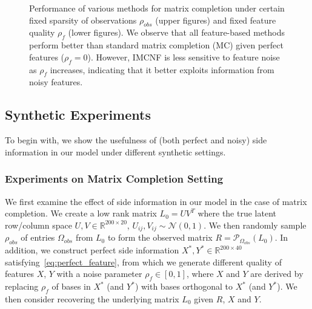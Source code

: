 \documentclass[twoside,11pt]{article}
\def\R{\mathbb{R}}
\def\Obs{\Omega_{obs}}
\newcommand\proj[1]{{\mathcal P}_{#1}}
\def\gau{{\mathcal N}}
\def\realL{L_0}
\begin{document}
\begin{figure}[tp]
  \caption{Performance of various methods for matrix completion under certain fixed sparsity of observations
    $\rho_{obs}$ (upper figures) and fixed feature quality $\rho_f$ (lower figures).
    We observe that all feature-based methods perform better than standard matrix completion (MC)
    given perfect features ($\rho_f = 0$).  However, IMCNF
    is less sensitive to feature noise as $\rho_f$ increases,
  indicating that it better exploits information from noisy features.}
  \label{fig:mc_synthetic}
\end{figure}

\subsection{Synthetic Experiments}
To begin with, we show the usefulness of (both perfect and noisy) side information
in our model under different synthetic settings.

\subsubsection{Experiments on Matrix Completion Setting}
\label{subsec:exp.mc}
We first examine the effect of side information in our model in the case of matrix completion.
We create a low rank matrix $\realL = UV^T$ where the true latent row/column space
$U, V \in \R^{200\times 20}$, $U_{ij}, V_{ij} \sim \gau(0, 1)$.
We then randomly sample $\rho_{obs}$ of entries $\Obs$ from $\realL$ to form
the observed matrix $R = \proj{\Obs}(\realL)$.  In addition, we construct perfect side information
$X^*, Y^* \in \R^{200 \times 40}$ satisfying~\eqref{eq:perfect_feature},
from which we generate different quality of features $X$, $Y$ with a noise parameter
$\rho_f \in [0, 1]$, where $X$ and $Y$ are derived by replacing
$\rho_f$ of bases in $X^*$ (and $Y^*$) with bases orthogonal to $X^*$ (and $Y^*$).
We then consider recovering the underlying matrix $\realL$ given $R$, $X$ and $Y$.
\end{document}
